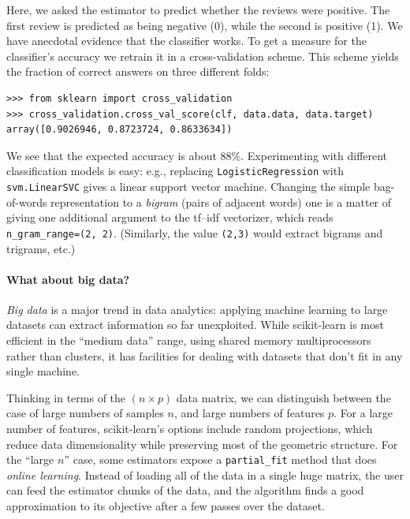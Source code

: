 \documentclass[a4paper]{article}
\begin{document}
Here, we asked the estimator to predict whether the reviews were
positive.
The first review is predicted as being negative (0),
while the second is positive (1). We have
anecdotal evidence that the classifier works. To get a measure for the
classifier's accuracy we retrain it in a cross-validation scheme.
This scheme yields the fraction of correct answers on three different folds:
\begin{lstlisting}
>>> from sklearn import cross_validation
>>> cross_validation.cross_val_score(clf, data.data, data.target)
array([0.9026946, 0.8723724, 0.8633634])
\end{lstlisting}

We see that the expected accuracy is about 88\%.
Experimenting with different classification models is easy:
e.g., replacing \texttt{LogisticRegression} with \texttt{svm.LinearSVC}
gives a linear support vector machine.
Changing the simple bag-of-words representation to a \textit{bigram}
(pairs of adjacent words) one is a matter of giving one additional argument
to the tf--idf vectorizer, which reads \texttt{n\_gram\_range=(2, 2)}.
(Similarly, the value \texttt{(2,3)} would extract bigrams and trigrams, etc.)

\paragraph{What about big data?}
%
\emph{Big data} is a major trend in data analytics: applying machine
learning to large datasets can extract information so far unexploited.
While scikit-learn is most efficient in the ``medium data'' range,
using shared memory multiprocessors rather than clusters,
it has facilities for dealing with datasets that don't fit
in any single machine.

Thinking in terms of the $(n \times p)$ data matrix,
we can distinguish between the case of large numbers of samples $n$,
and large numbers of features $p$.
For a large number of features, scikit-learn's options include
random projections, which reduce data dimensionality
while preserving most of the geometric structure.
For the ``large $n$'' case, some estimators expose a \texttt{partial\_fit}
method that does \emph{online learning}.
Instead of loading all of the data in a single huge matrix, the user
can feed the estimator chunks of the data,
and the algorithm finds a good approximation to its objective
after a few passes over the dataset.
\end{document}
